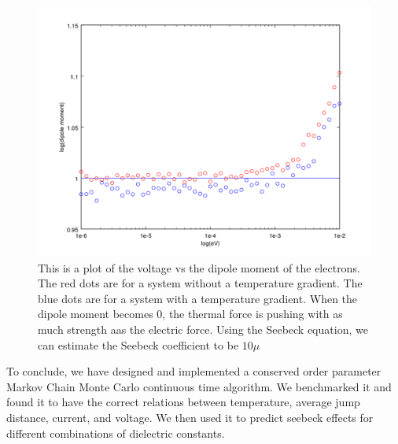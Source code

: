 \begin{figure}[htbp]
\begin{center}
\includegraphics[scale=.50]{VoltageVsDipole.png}
\caption{This is a plot of the voltage vs the dipole moment of the electrons. The red dots are for a system without a temperature gradient. The blue dots are for a system with a temperature gradient. When the dipole moment becomes 0, the thermal force is pushing with as much strength aas the electric force. Using the Seebeck equation, we can estimate the Seebeck coefficient to be $10 \mu$}
\label{TvJ}
\end{center}
\end{figure}

To conclude, we have designed and implemented a conserved order parameter Markov Chain Monte Carlo continuous time algorithm. We benchmarked it and found it to have the correct relations between temperature, average jump distance, current, and voltage. We then used it to predict seebeck effects for different combinations of dielectric constants.
